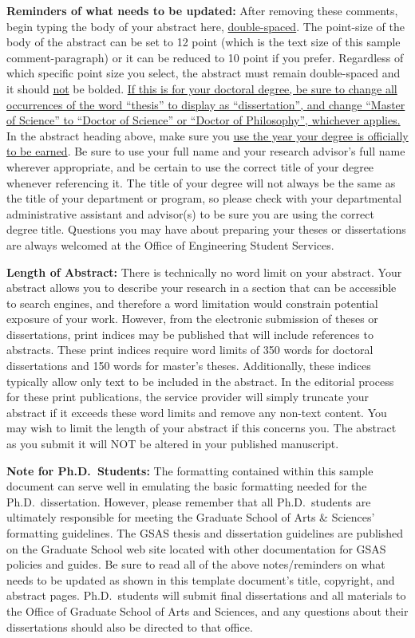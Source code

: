 \begin{thesisabstract}
\textbf{Reminders of what needs to be updated:} 
After removing these comments, begin typing the body of your abstract here,
\uline{double-spaced}.  The point-size of the body of the abstract can be set to
12 point (which is the text size of this sample comment-paragraph) or it can be
reduced to 10 point if you prefer.  Regardless of which specific point size you
select, the abstract must remain double-spaced and it should \uline{not} be
bolded.  \uline{If this is for your doctoral degree, be sure to change all
occurrences of the word ``thesis'' to display as ``dissertation'', and change
``Master of Science'' to ``Doctor of Science'' or ``Doctor of Philosophy'',
whichever applies.}  In the abstract heading above, make sure you \uline{use
the year your degree is officially to be earned}.  Be sure to use your full
name and your research advisor's full name wherever appropriate, and be certain
to use the correct title of your degree whenever referencing it. The title of
your degree will not always be the same as the title of your department or
program, so please check with your departmental administrative assistant and
advisor(s) to be sure you are using the correct degree title.  Questions you
may have about preparing your theses or dissertations are always welcomed at
the Office of Engineering Student Services.

\textbf{Length of Abstract:}
There is technically no word limit on your abstract.  Your abstract allows you
to describe your research in a section that can be accessible to search
engines, and therefore a word limitation would constrain potential exposure of
your work. However, from the electronic submission of theses or dissertations,
print indices may be published that will include references to abstracts. These
print indices require word limits of 350 words for doctoral dissertations and
150 words for master's theses. Additionally, these indices typically allow only
text to be included in the abstract. In the editorial process for these print
publications, the service provider will simply truncate your abstract if it
exceeds these word limits and remove any non-text content. You may wish to
limit the length of your abstract if this concerns you. The abstract as you
submit it will NOT be altered in your published manuscript.

\textbf{Note for Ph.D.\ Students:}
The formatting contained within this sample document can serve well in
emulating the basic formatting needed for the Ph.D.\ dissertation.   However,
please remember that all Ph.D.\ students are ultimately responsible for meeting
the Graduate School of Arts \& Sciences' formatting guidelines.  The GSAS
thesis and dissertation guidelines are published on the Graduate School web
site located with other documentation for GSAS policies and guides.  Be sure to
read all of the above notes/reminders on what needs to be updated as shown in
this template document's title, copyright, and abstract pages.  Ph.D.\ students
will submit final dissertations and all materials to the Office of Graduate
School of Arts and Sciences, and any questions about their dissertations should
also be directed to that office.
\end{thesisabstract}
